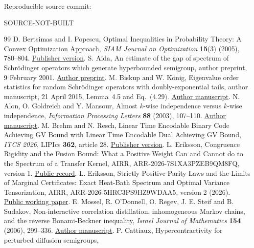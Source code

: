 \documentclass[11pt]{article}
\providecommand{\SourceCommit}{SOURCE-NOT-BUILT}
\begin{document}
\smallskip\noindent
Reproducible source commit:\par\noindent
{\small\ttfamily\SourceCommit}

\begin{thebibliography}{99}
D. Bertsimas and I. Popescu,
Optimal Inequalities in Probability Theory: A Convex Optimization Approach,
\emph{SIAM Journal on Optimization} \textbf{15}(3) (2005), 780--804.
\href{https://doi.org/10.1137/S1052623401399903}{Publisher version}.
S. Aida, An estimate of the gap of spectrum of Schr\"odinger operators
which generate hyperbounded semigroup, author preprint, 9 February 2001.
\href{https://www.ms.u-tokyo.ac.jp/~aida/paper/preprint/handai3.pdf}{Author preprint}.
M. Biskup and W. K\"onig, Eigenvalue order statistics for random
Schr\"odinger operators with doubly-exponential tails,
author manuscript, 21 April 2015, Lemma~4.5 and Eq.~(4.29).
\href{https://www.wias-berlin.de/people/koenig/www/PPP4PAM-CMP-final.pdf}{Author manuscript}.
N. Alon, O. Goldreich and Y. Mansour,
Almost $k$-wise independence versus $k$-wise independence,
\emph{Information Processing Letters} \textbf{88} (2003), 107--110.
\href{https://www.wisdom.weizmann.ac.il/~oded/PSX/agm.pdf}{Author manuscript}.
M. Brehm and N. Resch,
Linear Time Encodable Binary Code Achieving GV Bound with Linear Time
Encodable Dual Achieving GV Bound,
\emph{ITCS 2026}, LIPIcs \textbf{362}, article 28.
\href{https://doi.org/10.4230/LIPIcs.ITCS.2026.28}{Publisher version}.
L. Eriksson,
Congruence Rigidity and the Fusion Bound: What a Positive Weight Can and
Cannot do to the Spectrum of a Transfer Kernel,
AIRR, ARR-2026-7S1XA3PZEB9QM8FQ, version 1.
\href{https://airr.science/papers/ARR-2026-7S1XA3PZEB9QM8FQ/versions/v1/}{Public record}.
L. Eriksson,
Strictly Positive Parity Laws and the Limits of Marginal Certificates:
Exact Heat-Bath Spectrum and Optimal Variance Tensorization,
AIRR, ARR-2026-5HRC3PS9HZ9WDAA5, version 2 (2026).
\href{https://airr.science/papers/ARR-2026-5HRC3PS9HZ9WDAA5/versions/v2/}{Public working paper}.
E. Mossel, R. O'Donnell, O. Regev, J. E. Steif and B. Sudakov,
Non-interactive correlation distillation, inhomogeneous Markov chains,
and the reverse Bonami-Beckner inequality,
\emph{Israel Journal of Mathematics} \textbf{154} (2006), 299--336.
\href{https://www.cs.cmu.edu/~odonnell/papers/nicd.pdf}{Author manuscript}.
P. Cattiaux, Hypercontractivity for perturbed diffusion semigroups,

\end{thebibliography}
\end{document}
